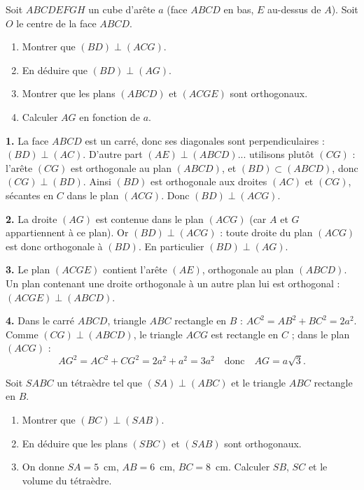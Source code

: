 \documentclass[11pt]{article}
\begin{document}
\begin{exoresolu}
Soit $ABCDEFGH$ un cube d'arête $a$ (face $ABCD$ en bas, $E$ au-dessus de $A$). Soit $O$ le centre de la face $ABCD$.
\begin{enumerate}
\item Montrer que $(BD) \perp (ACG)$.
\item En déduire que $(BD) \perp (AG)$.
\item Montrer que les plans $(ABCD)$ et $(ACGE)$ sont orthogonaux.
\item Calculer $AG$ en fonction de $a$.
\end{enumerate}
\tcblower
\textbf{1.} La face $ABCD$ est un carré, donc ses diagonales sont perpendiculaires : $(BD) \perp (AC)$. D'autre part $(AE) \perp (ABCD)$... utilisons plutôt $(CG)$ : l'arête $(CG)$ est orthogonale au plan $(ABCD)$, et $(BD) \subset (ABCD)$, donc $(CG) \perp (BD)$. Ainsi $(BD)$ est orthogonale aux droites $(AC)$ et $(CG)$, sécantes en $C$ dans le plan $(ACG)$. Donc $(BD) \perp (ACG)$.

\textbf{2.} La droite $(AG)$ est contenue dans le plan $(ACG)$ (car $A$ et $G$ appartiennent à ce plan). Or $(BD) \perp (ACG)$ : toute droite du plan $(ACG)$ est donc orthogonale à $(BD)$. En particulier $(BD) \perp (AG)$.

\textbf{3.} Le plan $(ACGE)$ contient l'arête $(AE)$, orthogonale au plan $(ABCD)$. Un plan contenant une droite orthogonale à un autre plan lui est orthogonal : $(ACGE) \perp (ABCD)$.

\textbf{4.} Dans le carré $ABCD$, triangle $ABC$ rectangle en $B$ : $AC^2 = AB^2 + BC^2 = 2a^2$. Comme $(CG) \perp (ABCD)$, le triangle $ACG$ est rectangle en $C$ ; dans le plan $(ACG)$ :
\[ AG^2 = AC^2 + CG^2 = 2a^2 + a^2 = 3a^2 \quad \text{donc} \quad AG = a\sqrt{3}. \]
\end{exoresolu}

\begin{exercice}
Soit $SABC$ un tétraèdre tel que $(SA) \perp (ABC)$ et le triangle $ABC$ rectangle en $B$.
\begin{enumerate}
\item Montrer que $(BC) \perp (SAB)$.
\item En déduire que les plans $(SBC)$ et $(SAB)$ sont orthogonaux.
\item On donne $SA = 5$~cm, $AB = 6$~cm, $BC = 8$~cm. Calculer $SB$, $SC$ et le volume du tétraèdre.
\end{enumerate}
\end{exercice}
\end{document}
